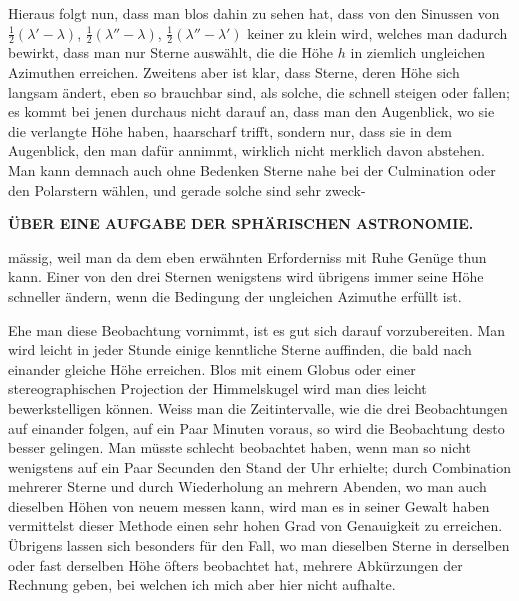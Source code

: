 Hieraus folgt nun, dass man blos dahin zu sehen hat, dass von den Sinussen
von $\tfrac12(\lambda'-\lambda)$, $\tfrac12(\lambda''-\lambda)$, $\tfrac12(\lambda''-\lambda')$ keiner zu klein wird, welches man
dadurch bewirkt, dass man nur Sterne auswählt, die die Höhe $h$ in ziemlich
ungleichen Azimuthen erreichen. Zweitens aber ist klar, dass Sterne, deren
Höhe sich langsam ändert, eben so brauchbar sind, als solche, die schnell steigen
oder fallen; es kommt bei jenen durchaus nicht darauf an, dass man den
Augenblick, wo sie die verlangte Höhe haben, haarscharf trifft, sondern nur,
dass sie in dem Augenblick, den man dafür annimmt, wirklich nicht merklich
davon abstehen. Man kann demnach auch ohne Bedenken Sterne nahe bei der
Culmination oder den Polarstern wählen, und gerade solche sind sehr zweck-\par
\clearpage
\thispagestyle{empty}
\noindent{}%
%
\parbox[t]{\dimexpr\linewidth-24mm\relax}{\centering\footnotesize\bfseries ÜBER EINE AUFGABE DER SPHÄRISCHEN ASTRONOMIE.\par}%
\makebox[12mm][r]{}\par\nobreak\medskip
\noindent mässig, weil man da dem eben erwähnten Erforderniss mit Ruhe Genüge thun
kann. Einer von den drei Sternen wenigstens wird übrigens immer seine Höhe
schneller ändern, wenn die Bedingung der ungleichen Azimuthe erfüllt ist.

Ehe man diese Beobachtung vornimmt, ist es gut sich darauf vorzubereiten.
Man wird leicht in jeder Stunde einige kenntliche Sterne auffinden, die
bald nach einander gleiche Höhe erreichen. Blos mit einem Globus oder einer
stereographischen Projection der Himmelskugel wird man dies leicht bewerkstelligen
können. Weiss man die Zeitintervalle, wie die drei Beobachtungen auf
einander folgen, auf ein Paar Minuten voraus, so wird die Beobachtung desto
besser gelingen. Man müsste schlecht beobachtet haben, wenn man so nicht wenigstens
auf ein Paar Secunden den Stand der Uhr erhielte; durch Combination
mehrerer Sterne und durch Wiederholung an mehrern Abenden, wo man auch
dieselben Höhen von neuem messen kann, wird man es in seiner Gewalt haben
vermittelst dieser Methode einen sehr hohen Grad von Genauigkeit zu erreichen.
Übrigens lassen sich besonders für den Fall, wo man dieselben Sterne in derselben
oder fast derselben Höhe öfters beobachtet hat, mehrere Abkürzungen der
Rechnung geben, bei welchen ich mich aber hier nicht aufhalte.

